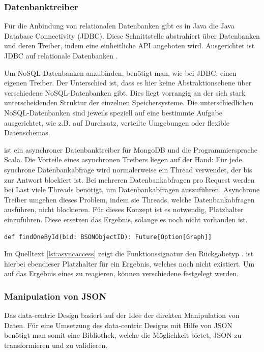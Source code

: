 \subsubsection{Datenbanktreiber}
\label{sec:reactive}
Für die Anbindung von relationalen Datenbanken gibt es in Java die Java Database Connectivity (JDBC). Diese Schnittstelle abstrahiert über Datenbanken und deren Treiber, indem eine einheitliche API angeboten wird. Ausgerichtet ist JDBC auf relationale Datenbanken \cite{reese2000database}.

Um NoSQL-Datenbanken anzubinden, benötigt man, wie bei JDBC, einen eigenen Treiber. Der Unterschied ist, dass es hier keine Abstraktionsebene über verschiedene NoSQL-Datenbanken gibt. Dies liegt vorrangig an der sich stark unterscheidenden Struktur der einzelnen Speichersysteme. Die unterschiedlichen NoSQL-Datenbanken sind jeweils speziell auf eine bestimmte Aufgabe ausgerichtet, wie z.B. auf Durchsatz, verteilte Umgebungen oder flexible Datenschemas. 

 ist ein asynchroner Datenbanktreiber für MongoDB und die Programmiersprache Scala. Die Vorteile eines asynchronen Treibers liegen auf der Hand: Für jede synchrone Datenbankabfrage wird normalerweise ein Thread verwendet, der bis zur Antwort blockiert ist. Bei mehreren Datenbankabfragen pro Request werden bei Last viele Threads benötigt, um Datenbankabfragen auszuführen. Asynchrone Treiber umgehen dieses Problem, indem sie Threads, welche Datenbankabfragen ausführen, nicht blockieren. Für dieses Konzept ist es notwendig, Platzhalter einzuführen. Diese ersetzen das Ergebnis, solange es noch nicht vorhanden ist.

\begin{lstlisting}[label=lst:asyncaccess, caption=Funktionssignatur für asynchronen Datenbankzugriff]
def findOneById(bid: BSONObjectID): Future[Option[Graph]]
\end{lstlisting}
 
Im Quelltext \ref{lst:asyncaccess} zeigt die Funktionssignatur den Rückgabetyp .  ist hierbei ebendieser Platzhalter für ein Ergebnis, welches noch nicht existiert. Um auf das Ergebnis eines  zu reagieren, können verschiedene  festgelegt werden.


\subsubsection{Manipulation von JSON}
Das data-centric Design basiert auf der Idee der direkten Manipulation von Daten. Für eine Umsetzung des data-centric Designs mit Hilfe von JSON benötigt man somit eine Bibliothek, welche die Möglichkeit bietet, JSON zu transformieren und zu validieren.
 
